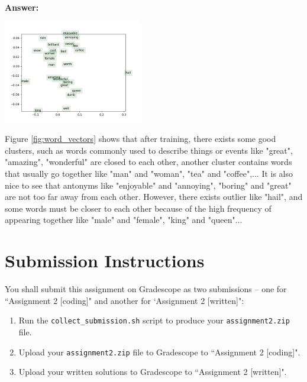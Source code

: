 \documentclass{article}
\newenvironment{answer}{
    {\bf Answer:} \sf \begingroup\color{red}
}{\endgroup}%
\begin{document}
\begin{enumerate}[label=(\alph*)]
\begin{shaded}
\begin{answer}

\begin{minipage}[h]{\linewidth}
    \begin{center}
   \vspace{-2ex}
   \includegraphics[width=0.45\textwidth]{word_vectors.png}
   \label{fig:word_vectors}
   \end{center}
\end{minipage} 

\color{red} {Figure \ref{fig:word_vectors} shows that after training, there exists some good clusters, such as words commonly used to describe things or events like "great", "amazing", "wonderful" are closed to each other, another cluster contains words that usually go together like "man" and "woman", "tea" and "coffee",... It is also nice to see that antonyms like "enjoyable" and "annoying", "boring" and "great" are not too far away from each other. However, there exists outlier like "hail", and some words must be closer to each other because of the high frequency of appearing together like "male" and "female", "king" and "queen"...}

\end{answer}
\end{shaded}

\section{Submission Instructions}
You shall submit this assignment on Gradescope as two submissions -- one for ``Assignment 2 [coding]" and another for `Assignment 2 [written]":
\begin{enumerate}
    \item Run the \texttt{collect\_submission.sh} script to produce your \texttt{assignment2.zip} file.
    \item Upload your \texttt{assignment2.zip} file to Gradescope to ``Assignment 2 [coding]".
    \item Upload your written solutions to Gradescope to ``Assignment 2 [written]".
\end{enumerate}

\end{enumerate}
\end{document}
